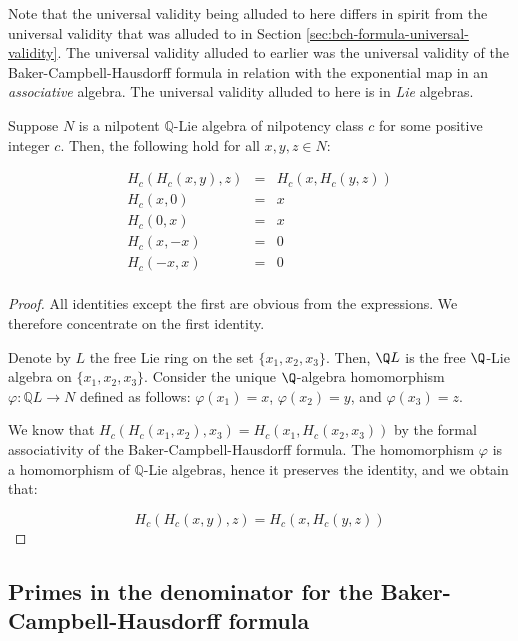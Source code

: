 \documentclass{ucetd}
\begin{document}
Note that the universal validity being alluded to here differs in
spirit from the universal validity that was alluded to in Section
\ref{sec:bch-formula-universal-validity}. The universal validity
alluded to earlier was the universal validity of the
Baker-Campbell-Hausdorff formula in relation with the exponential map
in an {\em associative} algebra. The universal validity alluded to
here is in {\em Lie} algebras.

\begin{theorem}\label{thm:bch-group-axiom-universal-validity}
  Suppose $N$ is a nilpotent $\mathbb{Q}$-Lie algebra of
  nilpotency class $c$ for some positive integer $c$. Then, the
  following hold for all $x,y,z \in N$:
    
  \begin{eqnarray*}
    H_c(H_c(x,y),z) & = & H_c(x,H_c(y,z)) \\
    H_c(x,0) & = & x \\
    H_c(0,x) & = & x \\
    H_c(x,-x) & = & 0 \\
    H_c(-x,x) & = & 0 \\
  \end{eqnarray*}
\end{theorem}

\begin{proof}
  All identities except the first are obvious from the expressions. We
  therefore concentrate on the first identity.

  Denote by $L$ the free Lie ring on the set $\{x_1,x_2,x_3\}$. Then,
  $\Q L$ is the free $\Q$-Lie algebra on $\{x_1,x_2,x_3\}$. Consider
  the unique $\Q$-algebra homomorphism $\varphi: \mathbb{Q}L \to N$
  defined as follows: $\varphi(x_1) = x$, $\varphi(x_2) = y$, and
  $\varphi(x_3) = z$. 

  We know that $H_c(H_c(x_1,x_2),x_3) = H_c(x_1,H_c(x_2,x_3))$ by the
  formal associativity of the Baker-Campbell-Hausdorff formula. The
  homomorphism $\varphi$ is a homomorphism of $\mathbb{Q}$-Lie
  algebras, hence it preserves the identity, and we obtain that:

  $$H_c(H_c(x,y),z) = H_c(x,H_c(y,z))$$

\end{proof}

\subsection{Primes in the denominator for the Baker-Campbell-Hausdorff formula}\label{sec:bch-primes-in-denominators}
\end{document}
